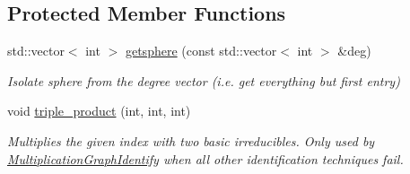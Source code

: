 \subsection*{Protected Member Functions}
\begin{DoxyCompactItemize}
\item 
std\+::vector$<$ int $>$ \hyperlink{classMackey_1_1MultiplicationTable_ad4245f4a8122f0661f969498ef53f999}{getsphere} (const std\+::vector$<$ int $>$ \&deg)
\begin{DoxyCompactList}\small\item\em Isolate sphere from the degree vector (i.\+e. get everything but first entry) \end{DoxyCompactList}\item 
void \hyperlink{classMackey_1_1MultiplicationTable_ae2801cd35f426f10c89ab8addb75f829}{triple\+\_\+product} (int, int, int)
\begin{DoxyCompactList}\small\item\em Multiplies the given index with two basic irreducibles. Only used by \hyperlink{classMackey_1_1MultiplicationGraphIdentify}{Multiplication\+Graph\+Identify} when all other identification techniques fail. \end{DoxyCompactList}\end{DoxyCompactItemize}
